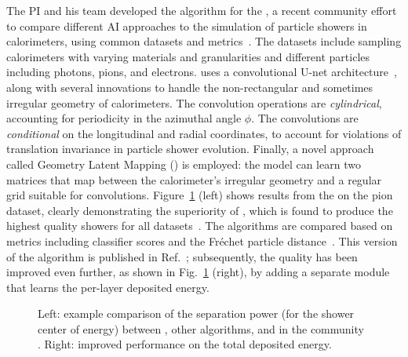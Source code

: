 The PI and his team developed the \diffu algorithm for the \challenge,
a recent community effort to compare different AI approaches to the simulation of particle showers in calorimeters, using common datasets and metrics~\cite{CaloChallenge}.
The datasets include sampling calorimeters with varying materials and granularities and different particles including photons, pions, and electrons.
\diffu uses a convolutional U-net architecture~\cite{Ronneberger:2015}, along with several innovations to handle the non-rectangular and sometimes irregular geometry of calorimeters.
The convolution operations are \textit{cylindrical}, accounting for periodicity in the azimuthal angle $\phi$.
The convolutions are \textit{conditional} on the longitudinal and radial coordinates, to account for violations of translation invariance in particle shower evolution.
Finally, a novel approach called Geometry Latent Mapping (\glam) is employed:
the model can learn two matrices that map between the calorimeter's irregular geometry and a regular grid suitable for convolutions.
Figure~\ref{fig:calodiffu} (left) shows results from the \challenge on the pion dataset, clearly demonstrating the superiority of \diffu,
which is found to produce the highest quality showers for all datasets~\cite{Krause:2023mlj}.
The algorithms are compared based on metrics including classifier scores and the Fr\'echet particle distance~\cite{Kansal:2022spb}.
This version of the algorithm is published in Ref.~\cite{Amram:2023onf};
subsequently, the quality has been improved even further, as shown in Fig.~\ref{fig:calodiffu} (right), by adding a separate module that learns the per-layer deposited energy.

\begin{figure}[htb!]
\centering
{}
\caption{Left: example comparison of the separation power (for the shower center of energy) between \diffu, other algorithms, and \GEANTfour in the community \challenge.
Right: improved \diffu performance on the total deposited energy.}
\label{fig:calodiffu}
\end{figure}

